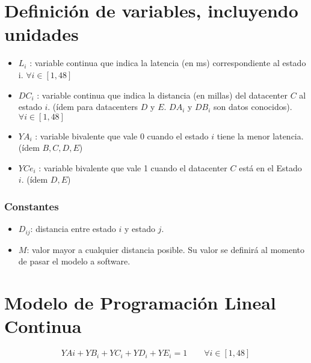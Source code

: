 \documentclass{article}
\begin{document}
\part{Definici\'on de variables, incluyendo unidades}
\begin{itemize}
	\item $L_{i}$ : variable continua que indica la latencia (en ms) correspondiente al estado i. $\forall i \in [1, 48]$
	\item $DC_{i}$ : variable continua que indica la distancia (en millas) del datacenter $C$ al estado $i$. (\'idem para datacenters $D$ y $E$. $DA_{i}$ y  $DB_{i}$ son datos conocidos). $\forall i \in [1, 48]$
	\item $YA_{i}$ : variable bivalente que vale 0 cuando el estado $i$ tiene la menor latencia. (\'idem $B,C,D,E$)
	\item $YCe_{i}$ : variable bivalente que vale 1 cuando el datacenter $C$ est\'a en el Estado $i$. (\'idem $D, E$)
\end{itemize}
\section*{Constantes}
\begin{itemize}
\item $D_{ij}$: distancia entre estado $i$ y estado $j$.
\item $M$: valor mayor a cualquier distancia posible. Su valor se definir\'a al momento de pasar el modelo a software.
\end{itemize}

\part{Modelo de Programaci\'on Lineal Continua}

\begin{equation}
	YA{i} + YB_{i} + YC_i + YD_i + YE_i = 1 \qquad \forall i \in [1, 48]
\end{equation}
\end{document}
